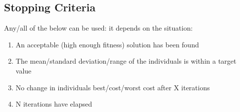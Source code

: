 \subsection{Stopping Criteria}
Any/all of the below can be used: it depends on the situation:
\begin{enumerate}
    \item An acceptable (high enough fitness) solution has been found
    \item The mean/standard deviation/range of the individuals is within a target value
    \item No change in individuals best/cost/worst cost after X iterations
    \item N iterations have elapsed
\end{enumerate}